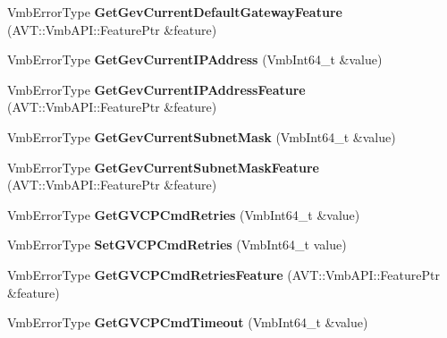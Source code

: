 \begin{DoxyCompactItemize}
\item 
\hypertarget{classMakoCamera_acf8b28c9a1754f36127fca84eb96b4a8}{Vmb\-Error\-Type {\bfseries Get\-Gev\-Current\-Default\-Gateway\-Feature} (A\-V\-T\-::\-Vmb\-A\-P\-I\-::\-Feature\-Ptr \&feature)}\label{classMakoCamera_acf8b28c9a1754f36127fca84eb96b4a8}

\item 
\hypertarget{classMakoCamera_ad927f7653b731d446031cb0232d8858f}{Vmb\-Error\-Type {\bfseries Get\-Gev\-Current\-I\-P\-Address} (Vmb\-Int64\-\_\-t \&value)}\label{classMakoCamera_ad927f7653b731d446031cb0232d8858f}

\item 
\hypertarget{classMakoCamera_a81e4f4ba026aa15c96e68119086eeaaa}{Vmb\-Error\-Type {\bfseries Get\-Gev\-Current\-I\-P\-Address\-Feature} (A\-V\-T\-::\-Vmb\-A\-P\-I\-::\-Feature\-Ptr \&feature)}\label{classMakoCamera_a81e4f4ba026aa15c96e68119086eeaaa}

\item 
\hypertarget{classMakoCamera_a651c1326b0c84c5da60f69b8215ffa29}{Vmb\-Error\-Type {\bfseries Get\-Gev\-Current\-Subnet\-Mask} (Vmb\-Int64\-\_\-t \&value)}\label{classMakoCamera_a651c1326b0c84c5da60f69b8215ffa29}

\item 
\hypertarget{classMakoCamera_a68bc16ad976ce2bebba7d5422d82daf5}{Vmb\-Error\-Type {\bfseries Get\-Gev\-Current\-Subnet\-Mask\-Feature} (A\-V\-T\-::\-Vmb\-A\-P\-I\-::\-Feature\-Ptr \&feature)}\label{classMakoCamera_a68bc16ad976ce2bebba7d5422d82daf5}

\item 
\hypertarget{classMakoCamera_a13e45757f2b07de1c7c1fe55af96aed8}{Vmb\-Error\-Type {\bfseries Get\-G\-V\-C\-P\-Cmd\-Retries} (Vmb\-Int64\-\_\-t \&value)}\label{classMakoCamera_a13e45757f2b07de1c7c1fe55af96aed8}

\item 
\hypertarget{classMakoCamera_a0d10b8661c148a81fb6b6815967afb5c}{Vmb\-Error\-Type {\bfseries Set\-G\-V\-C\-P\-Cmd\-Retries} (Vmb\-Int64\-\_\-t value)}\label{classMakoCamera_a0d10b8661c148a81fb6b6815967afb5c}

\item 
\hypertarget{classMakoCamera_a8ada5164008fce96cabc73692baffccd}{Vmb\-Error\-Type {\bfseries Get\-G\-V\-C\-P\-Cmd\-Retries\-Feature} (A\-V\-T\-::\-Vmb\-A\-P\-I\-::\-Feature\-Ptr \&feature)}\label{classMakoCamera_a8ada5164008fce96cabc73692baffccd}

\item 
\hypertarget{classMakoCamera_a255fd615ca2eef876189722065e6d9d9}{Vmb\-Error\-Type {\bfseries Get\-G\-V\-C\-P\-Cmd\-Timeout} (Vmb\-Int64\-\_\-t \&value)}\label{classMakoCamera_a255fd615ca2eef876189722065e6d9d9}


\end{DoxyCompactItemize}
